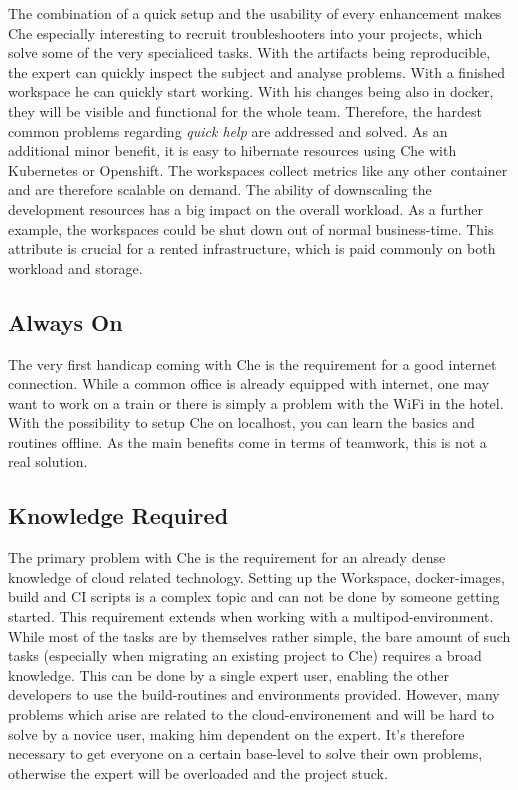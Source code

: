 \documentclass[utf8]{lni}
\begin{document}
The combination of a quick setup and the usability of every enhancement makes Che especially interesting to recruit troubleshooters into your projects, which solve some of the very specialiced tasks.  
With  the  artifacts  being  reproducible,  the  expert  can quickly inspect the subject and analyse problems.
With a finished workspace he can quickly start working. 
With his changes being also in docker, they will be visible and functional for the whole team.
Therefore,  the  hardest  common  problems  regarding \textit{quick help} are addressed and solved. 
As an additional minor benefit, it is easy to hibernate resources  using  Che  with  Kubernetes  or  Openshift.
The workspaces collect metrics like any other container and are therefore scalable on demand. 
The ability of downscaling the development resources has a big impact on the overall 
workload. 
As a further example, the workspaces could be shut down out of normal business-time. This attribute is crucial for a rented infrastructure, which is paid commonly on both workload and storage. 
\subsection{Always On}
The very first handicap coming with Che is the requirement for a good internet connection. 
While a common office is already equipped with internet, one may want to work on a train or there is simply a problem with the WiFi in the hotel.
With the possibility to setup Che on localhost, you can learn the basics and routines offline. As the main benefits come in terms of teamwork, this is not a real solution.
\subsection{Knowledge Required}
The primary problem with Che is the requirement for an already dense knowledge of cloud related technology.
Setting up the Workspace, docker-images, build and CI scripts is a complex topic and can not be done by someone getting started. 
This requirement extends when working with a multipod-environment. 
While most of the tasks are by themselves rather simple, the bare amount of such tasks (especially when migrating an existing project to Che) requires a broad knowledge.
This can be done by a single expert user, enabling the other developers  to  use  the  build-routines and  environments provided. 
However, many problems which arise are related to the cloud-environement and will be hard to solve by a novice user, making him dependent on the expert. 
It's therefore necessary to get everyone on a certain base-level to solve their own problems, otherwise the expert will be overloaded and the project stuck.  
\end{document}
